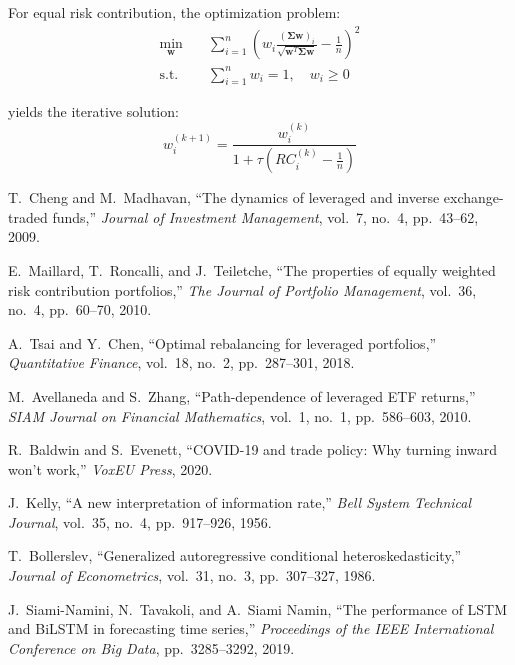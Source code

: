 \documentclass[onecolumn,ieee]{arithmaxresearch}
\begin{document}
For equal risk contribution, the optimization problem:
\begin{align}
\min_{\mathbf{w}} &\quad \sum_{i=1}^n \left( w_i \frac{(\boldsymbol{\Sigma}\mathbf{w})_i}{\sqrt{\mathbf{w}^T\boldsymbol{\Sigma}\mathbf{w}}} - \frac{1}{n} \right)^2 \\
\text{s.t.} &\quad \sum_{i=1}^n w_i = 1, \quad w_i \geq 0
\end{align}

yields the iterative solution:
\begin{equation}
w_i^{(k+1)} = \frac{w_i^{(k)}}{1 + \tau \left( RC_i^{(k)} - \frac{1}{n} \right)}
\end{equation}

\begin{thebibliography}{12}

T.~Cheng and M.~Madhavan,
``The dynamics of leveraged and inverse exchange-traded funds,''
\emph{Journal of Investment Management}, vol.~7, no.~4, pp.~43--62, 2009.

E.~Maillard, T.~Roncalli, and J.~Teiletche,
``The properties of equally weighted risk contribution portfolios,''
\emph{The Journal of Portfolio Management}, vol.~36, no.~4, pp.~60--70, 2010.

A.~Tsai and Y.~Chen,
``Optimal rebalancing for leveraged portfolios,''
\emph{Quantitative Finance}, vol.~18, no.~2, pp.~287--301, 2018.

M.~Avellaneda and S.~Zhang,
``Path-dependence of leveraged ETF returns,''
\emph{SIAM Journal on Financial Mathematics}, vol.~1, no.~1, pp.~586--603, 2010.

R.~Baldwin and S.~Evenett,
``COVID-19 and trade policy: Why turning inward won't work,''
\emph{VoxEU Press}, 2020.

J.~Kelly,
``A new interpretation of information rate,''
\emph{Bell System Technical Journal}, vol.~35, no.~4, pp.~917--926, 1956.

T.~Bollerslev,
``Generalized autoregressive conditional heteroskedasticity,''
\emph{Journal of Econometrics}, vol.~31, no.~3, pp.~307--327, 1986.

J.~Siami-Namini, N.~Tavakoli, and A.~Siami Namin,
``The performance of LSTM and BiLSTM in forecasting time series,''
\emph{Proceedings of the IEEE International Conference on Big Data}, pp.~3285--3292, 2019.


\end{thebibliography}
\end{document}

